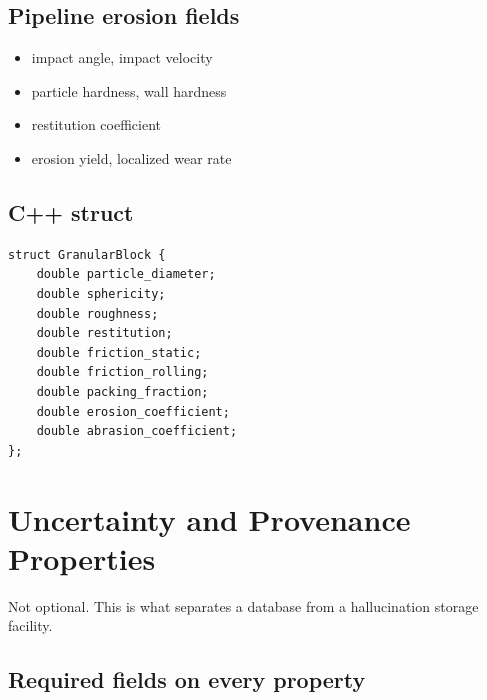 \documentclass[11pt, a4paper]{article}
\begin{document}
\subsection{Pipeline erosion fields}

\begin{itemize}[itemsep=1pt, leftmargin=*]
  \item impact angle, impact velocity
  \item particle hardness, wall hardness
  \item restitution coefficient
  \item erosion yield, localized wear rate
\end{itemize}

\subsection{C++ struct}

\begin{lstlisting}
struct GranularBlock {
    double particle_diameter;
    double sphericity;
    double roughness;
    double restitution;
    double friction_static;
    double friction_rolling;
    double packing_fraction;
    double erosion_coefficient;
    double abrasion_coefficient;
};
\end{lstlisting}

\section{Uncertainty and Provenance Properties}

Not optional. This is what separates a database from a hallucination storage facility.

\subsection{Required fields on every property}
\end{document}
